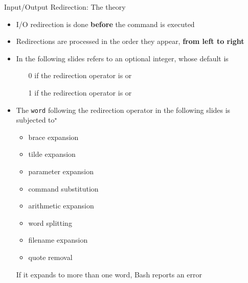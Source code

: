 \begin{frame}{Input/Output Redirection: The theory}
    \vspace{-3mm}
    \begin{itemize}
        \item I/O redirection is done \alert{\textbf{before}} the command is executed
        \item Redirections are processed in the order they appear, \textbf{from left to right}
        \item In the following slides \PB{\texttt{[n]}} refers to an optional integer, whose default is
              \begin{itemize}
                  \item[0] if the redirection operator is \PB{\texttt{<}} or \PB{\texttt{<>}}
                  \item[1] if the redirection operator is \PB{\texttt{>}} or \PB{\texttt{>>}}
              \end{itemize}
        \item The \texttt{word} following the redirection operator in the following slides is subjected to$^\star$
              \begin{itemize}
                  \item brace expansion
                  \item tilde expansion
                  \item parameter expansion
                  \item command substitution
                  \item arithmetic expansion
                  \item word splitting
                  \item filename expansion
                  \item quote removal
              \end{itemize}
              \alert{If it expands to more than one word, Bash reports an error}
    \end{itemize}
\end{frame}
